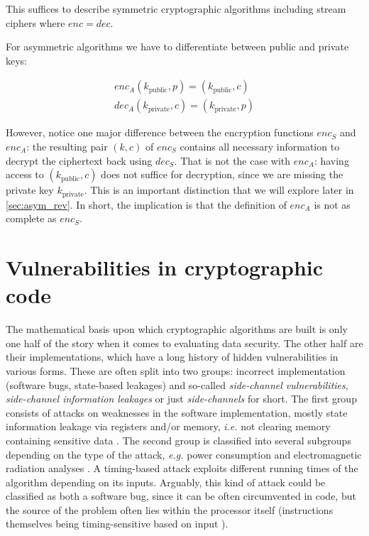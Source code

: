 \documentclass[a4paper,10pt,openright]{memoir}
\newcommand{\ie}{\emph{i.e.}\xspace}
\newcommand{\eg}{\emph{e.g.}\xspace}
\def\enc{\ensuremath{\mathit{enc}}}
\def\dec{\ensuremath{\mathit{dec}}}
\newcommand{\term}[1]{\textit{#1}}
\begin{document}
This suffices to describe symmetric cryptographic algorithms including 
stream ciphers where $\enc = \dec$.

For asymmetric algorithms we have to differentiate between public and 
private keys:

\begin{align*}
\enc_A(k_\text{public},p) = (k_\text{public},c) \\
\dec_A(k_\text{private},c) = (k_\text{private},p) 
\end{align*}

However, notice one major difference between the encryption functions 
$\enc_S$ and $\enc_A$: the resulting pair $(k, c)$ of $\enc_S$ contains 
all necessary information to decrypt the ciphertext back using 
$\dec_S$. That is not the case with $\enc_A$: having access to 
$(k_\text{public},c)$ does not suffice for decryption, since we are 
missing the private key $k_\text{private}$. This is an important 
distinction that we will explore later in \ref{sec:asym_rev}. In short, 
the implication is that the definition of $\enc_A$ is not as complete 
as $\enc_S$.

\section{Vulnerabilities in cryptographic code}

The mathematical basis upon which cryptographic algorithms are built is 
only one half of the story when it comes to evaluating data security. 
The other half are their implementations, which have a long history of 
hidden vulnerabilities in various forms. These are often split into two 
groups: incorrect implementation (software bugs, state-based leakages) 
and so-called \term{side-channel vulnerabilities}, \term{side-channel 
information leakages} or just \term{side-channels} for short. The first 
group consists of attacks on weaknesses in the software implementation, 
mostly state information leakage via registers and/or memory, \ie not 
clearing memory containing sensitive data \cite{Chow:2004}. The second 
group is classified into several subgroups depending on the type of the 
attack, \eg power consumption and electromagnetic radiation analyses 
\cite{Spreitzer:2016}. A timing-based attack exploits different running 
times of the algorithm depending on its inputs. Arguably, this kind of 
attack could be classified as both a software bug, since it can be 
often circumvented in code, but the source of the problem often lies 
within the processor itself (instructions themselves being 
timing-sensitive based on input \cite{TimingRC5}).
\end{document}
